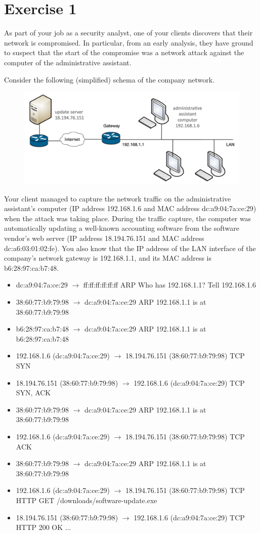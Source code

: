 \section{Exercise 1}

As part of your job as a security analyst, one of your clients discovers that their network is compromised. 
In particular, from an early analysis, they have ground to suspect that the start of the compromise was a network attack against the computer of the administrative assistant.

Consider the following (simplified) schema of the company network.
\begin{figure}[H]
    \centering
    \includegraphics[width=0.75\linewidth]{images/net.png}
\end{figure}
Your client managed to capture the network traffic on the administrative assistant's computer (IP address 192.168.1.6 and MAC address dc:a9:04:7a:ce:29) when the attack was taking place. 
During the traffic capture, the computer was automatically updating a well-known accounting software from the software vendor's web server (IP address 18.194.76.151 and MAC address dc:a6:03:01:02:fe). 
You also know that the IP address of the LAN interface of the company's network gateway is 192.168.1.1, and its MAC address is b6:28:97:ca:b7:48.
\begin{itemize}
    \item dc:a9:04:7a:ce:29 $\rightarrow$ ff:ff:ff:ff:ff:ff ARP Who has 192.168.1.1? Tell 192.168.1.6
    \item 38:60:77:b9:79:98 $\rightarrow$ dc:a9:04:7a:ce:29 ARP 192.168.1.1 is at 38:60:77:b9:79:98
    \item b6:28:97:ca:b7:48 $\rightarrow$ dc:a9:04:7a:ce:29 ARP 192.168.1.1 is at b6:28:97:ca:b7:48
    \item 192.168.1.6 (dc:a9:04:7a:ce:29) $\rightarrow$ 18.194.76.151 (38:60:77:b9:79:98) TCP SYN
    \item 18.194.76.151 (38:60:77:b9:79:98) $\rightarrow$ 192.168.1.6 (dc:a9:04:7a:ce:29) TCP SYN, ACK
    \item 38:60:77:b9:79:98 $\rightarrow$ dc:a9:04:7a:ce:29 ARP 192.168.1.1 is at 38:60:77:b9:79:98
    \item 192.168.1.6 (dc:a9:04:7a:ce:29) $\rightarrow$ 18.194.76.151 (38:60:77:b9:79:98) TCP ACK
    \item 38:60:77:b9:79:98 $\rightarrow$ dc:a9:04:7a:ce:29 ARP 192.168.1.1 is at 38:60:77:b9:79:98
    \item 192.168.1.6 (dc:a9:04:7a:ce:29) $\rightarrow$ 18.194.76.151 (38:60:77:b9:79:98) TCP HTTP GET /downloads/software-update.exe
    \item 18.194.76.151 (38:60:77:b9:79:98) $\rightarrow$ 192.168.1.6 (dc:a9:04:7a:ce:29) TCP HTTP 200 OK ...
\end{itemize}
